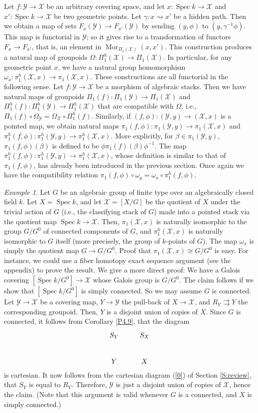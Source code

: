 \documentclass{amsart}
\theoremstyle{definition}
\theoremstyle{remark}
\theoremstyle{remark}
\newtheorem{ex}[thm]{Example}
\newcommand{\X}{\mathcal{X}}
\newcommand{\Y}{\mathcal{Y}}
\newcommand{\ox}{\omega_x}
\newcommand{\rsa}{\rightsquigarrow}
\newcommand{\st}[1]{\stackrel{#1}{\rightrightarrows}}
\newcommand{\PX}{\Pi_1(\X)}
\newcommand{\pX}{\pi_1(\X,x)}
\newcommand{\PhX}{\Pi_1^{h}(\X)}
\newcommand{\phX}{\pi_1^{h}(\X,x)}
\newcommand{\PY}{\Pi_1(\Y)}
\newcommand{\pY}{\pi_1(\Y,y)}
\newcommand{\PhY}{\Pi_1^{h}(\Y)}
\newcommand{\phY}{\pi_1^{h}(\Y,y)}
\let\:=\colon
\newcommand{\Spec}{\operatorname{Spec}}
\newcommand{\Mor}{\operatorname{Mor}}
\begin{document}
Let $f \: \Y \to \X$ be an arbitrary covering space, and let $x \:
\Spec k \to \X$ and $x' \: \Spec k \to \X$ be two geometric
points. Let $\gamma \: x \rsa x'$ be a hidden path. Then we obtain
a map of sets $F_x(\Y) \to F_{x'}(\Y)$ by sending $(y, \phi)$ to
$(y, \gamma^{-1}\phi)$. This map is functorial in $\Y$; so it
gives rise to a transformation of functors $F_x \to F_{x'}$, that
is, an element in $\Mor_{\PX}(x,x')$. This construction produces a
natural  map of groupoids $\Omega \: \PhX \to \PX$. In particular,
for any geometric point $x$, we have a natural group homomorphism
$\omega_x \: \phX \to \pX$. These constructions are all functorial
in the following sense. Let $f \: \Y \to \X$ be a morphism of
algebraic stacks. Then we have natural maps of groupoids $\Pi_1(f)
\: \PY \to \PX$ and $\Pi_1^{h}(f) \: \PhY \to \PhX$ that are
compatible with $\Omega$, i.e., $\Pi_1(f) \circ \Omega_{\Y} =
\Omega_{\X} \circ \Pi_1^{h}(f)$. Similarly, if $(f, \phi) \:
(\Y,y) \to (\X ,x)$ is a pointed map, we obtain natural maps
$\pi_1(f, \phi) \: \pY \to \pX$  and $\pi_1^{h}(f, \phi) \: \phY
\to \phX$. More explicitly, for $\beta \in \pY$, $\pi_1(f,
\phi)(\beta)$ is defined to be $\phi \pi_1(f)(\beta) \phi^{-1}$.
The map $\pi_1^{h}(f, \phi) \: \phY \to \phX$, whose definition is
similar to that of  $\pi_1(f, \phi)$, has already been introduced
in the previous section. Once again we have the compatibility
relation $\pi_1(f, \phi) \circ \omega_y = \omega_x \circ
\pi_1^{h}(f, \phi)$.

\begin{ex}{\label{P5.9}}
Let $G$ be an algebraic group of finite type over an algebraically
closed field $k$. Let $X=\Spec k$, and let $\X=[X/G]$ be the
quotient of $X$ under the trivial action of $G$ (i.e., the
classifying stack of $G$) made into a pointed stack via the
quotient map $\Spec k \to \X$. Then, $\pX$ is naturally isomorphic
to the group $G/{G^0}$ of connected components of $G$, and $\phX$
is naturally isomorphic to $G$ itself (more precisely, the group
of $k$-points of $G$). The map $\ox$ is simply the quotient map $G
\to G/{G^0}$.  Proof that $\pX \cong G/{G^0}$ is easy. For
instance, we could use a fiber homotopy exact sequence argument
(see the appendix)
 to prove
the result. We give a more direct proof: We have a  Galois
covering $[\Spec k/G^{0}] \to \X$  whose Galois group is
$G/{G^0}$. The claim follows if we show that $[\Spec k/G^{0}]$ is
simply connected. So we may assume $G$ is connected. Let $\Y \to
\X$ be a covering map,  $Y \to \Y$ the pull-back of $X \to \X$,
and $R_Y \st{} Y$ the corresponding groupoid. Then, $Y$ is a
disjoint union of copies of $X$. Since $G$ is connected, it
follows from Corollary \ref{P4.9}, that the diagram $$\xymatrix{
S_Y \ar[r] \ar[d] & S_X \ar[d] \\
             Y \ar[r]        & X }$$
\noindent is cartesian. It now follows from the cartesian diagram
(\ref{0}) of Section \ref{S:review}, that $S_Y$ is equal to $R_Y$.
Therefore, $\Y$ is just a disjoint union of copies of $\X$, hence
the claim. (Note that this argument is valid whenever $G$ is a
connected, and $X$ is simply connected.)
\end{ex}
\end{document}

